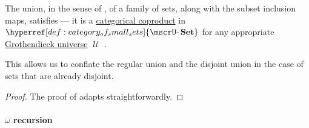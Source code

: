 \begin{proposition}\label{thm:disjoint_union_of_disjoint_sets}
  The union, in the sense of , of a family of \hyperref[def:subset_ordering]{} sets, along with the subset inclusion maps, satisfies  --- it is a \hyperref[def:discrete_category_limits]{categorical coproduct} in \( \hyperref[def:category_of_small_sets]{\ucat{Set}} \) for any appropriate \hyperref[def:grothendieck_universe]{Grothendieck universe} \( \mscrU \) .
\end{proposition}
\begin{comments}
  \item This allows us to conflate the regular union and the disjoint union in the case of sets that are already disjoint.
\end{comments}
\begin{proof}
  The proof of  adapts straightforwardly.
\end{proof}

\paragraph{\( \omega \) recursion}

